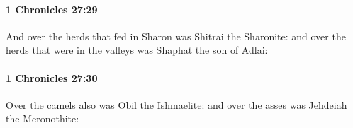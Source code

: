 		\paragraph{1 Chronicles 27:29} %
			\label{1CHRONICLES-27-29}

			And over the herds that fed in Sharon was Shitrai the Sharonite: and over the herds that were in the valleys was Shaphat the son of Adlai:


		\paragraph{1 Chronicles 27:30} %
			\label{1CHRONICLES-27-30}

			Over the camels also was Obil the Ishmaelite: and over the asses was Jehdeiah the Meronothite:



